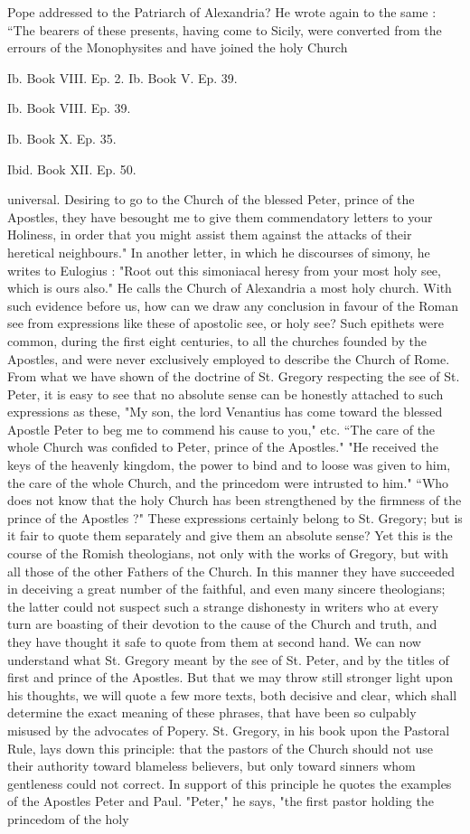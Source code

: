Pope addressed to the Patriarch of Alexandria? He wrote again to the same : “The bearers of these presents, having come to Sicily, were converted from the errours of the Monophysites and have joined the holy Church

Ib. Book VIII. Ep. 2. Ib. Book V. Ep. 39.

Ib. Book VIII. Ep. 39.

Ib. Book X. Ep. 35.

Ibid. Book XII. Ep. 50.

universal. Desiring to go to the Church of the blessed Peter, prince of the Apostles, they have besought me to give them commendatory letters to your Holiness, in order that you might assist them against the attacks of their heretical neighbours." In another letter, in which he discourses of simony, he writes to Eulogius : "Root out this simoniacal heresy from your most holy see, which is ours also." He calls the Church of Alexandria a most holy church. With such evidence before us, how can we draw any conclusion in favour of the Roman see from expressions like these of apostolic see, or holy see? Such epithets were common, during the first eight centuries, to all the churches founded by the Apostles, and were never exclusively employed to describe the Church of Rome. From what we have shown of the doctrine of St. Gregory respecting the see of St. Peter, it is easy to see that no absolute sense can be honestly attached to such expressions as these, "My son, the lord Venantius has come toward the blessed Apostle Peter to beg me to commend his cause to you," etc. “The care of the whole Church was confided to Peter, prince of the Apostles." "He received the keys of the heavenly kingdom, the power to bind and to loose was given to him, the care of the whole Church, and the princedom were intrusted to him." “Who does not know that the holy Church has been strengthened by the firmness of the prince of the Apostles ?" These expressions certainly belong to St. Gregory; but is it fair to quote them separately and give them an absolute sense? Yet this is the course of the Romish theologians, not only with the works of Gregory, but with all those of the other Fathers of the Church. In this manner they have succeeded in deceiving a great number of the faithful, and even many sincere theologians; the latter could not suspect such a strange dishonesty in writers who at every turn are boasting of their devotion to the cause of the Church and truth, and they have thought it safe to quote from them at second hand. We can now understand what St. Gregory meant by the see of St. Peter, and by the titles of first and prince of the Apostles. But that we may throw still stronger light upon his thoughts, we will quote a few more texts, both decisive and clear, which shall determine the exact meaning of these phrases, that have been so culpably misused by the advocates of Popery. St. Gregory, in his book upon the Pastoral Rule, lays down this principle: that the pastors of the Church should not use their authority toward blameless believers, but only toward sinners whom gentleness could not correct. In support of this principle he quotes the examples of the Apostles Peter and Paul. "Peter," he says, "the first pastor holding the princedom of the holy 